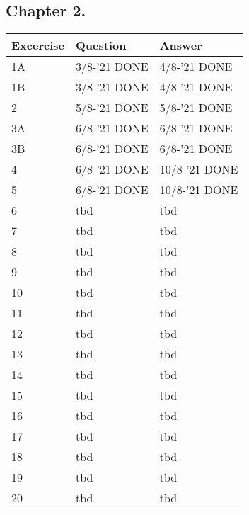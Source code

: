 \subsection*{Chapter 2.}
\begin{tabular}{|l|l|l|}
    \hline
    \rowcolor[HTML]{EFEFEF}
    {\color[HTML]{000000} Excercise } & {\color[HTML]{000000} Question } & {\color[HTML]{000000} Answer } \\ \hline
    1A & 3/8-'21 DONE & 4/8-'21 DONE \\ \hline
    1B & 3/8-'21 DONE & 4/8-'21 DONE \\ \hline
    2 & 5/8-'21 DONE & 5/8-'21 DONE \\ \hline
    3A & 6/8-'21 DONE & 6/8-'21 DONE \\ \hline
    3B & 6/8-'21 DONE & 6/8-'21 DONE \\ \hline
    4 & 6/8-'21 DONE & 10/8-'21 DONE \\ \hline
    5 & 6/8-'21 DONE & 10/8-'21 DONE \\ \hline
    6 & tbd & tbd \\ \hline
    7 & tbd & tbd \\ \hline
    8 & tbd & tbd \\ \hline
    9 & tbd & tbd \\ \hline
    10 & tbd & tbd \\ \hline
    11 & tbd & tbd \\ \hline
    12 & tbd & tbd \\ \hline
    13 & tbd & tbd \\ \hline
    14 & tbd & tbd \\ \hline
    15 & tbd & tbd \\ \hline
    16 & tbd & tbd \\ \hline
    17 & tbd & tbd \\ \hline
    18 & tbd & tbd \\ \hline
    19 & tbd & tbd \\ \hline
    20 & tbd & tbd \\ \hline
\end{tabular}
